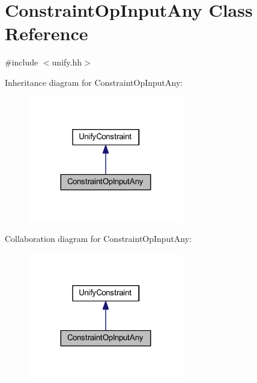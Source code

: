 \hypertarget{class_constraint_op_input_any}{}\section{Constraint\+Op\+Input\+Any Class Reference}
\label{class_constraint_op_input_any}


{\ttfamily \#include $<$unify.\+hh$>$}



Inheritance diagram for Constraint\+Op\+Input\+Any\+:
\nopagebreak
\begin{figure}[H]
\begin{center}
\leavevmode
\includegraphics[width=192pt]{class_constraint_op_input_any__inherit__graph}
\end{center}
\end{figure}


Collaboration diagram for Constraint\+Op\+Input\+Any\+:
\nopagebreak
\begin{figure}[H]
\begin{center}
\leavevmode
\includegraphics[width=192pt]{class_constraint_op_input_any__coll__graph}
\end{center}
\end{figure}
